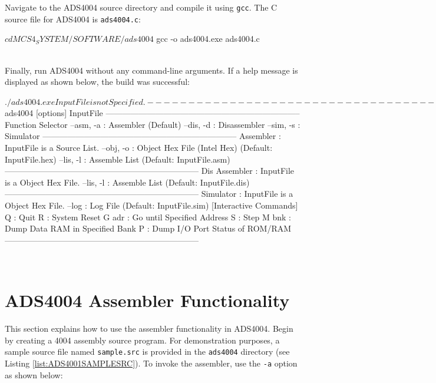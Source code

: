 Navigate to the ADS4004 source directory and compile it using \texttt{gcc}.  
The C source file for ADS4004 is \texttt{ads4004.c}:\\

\begin{scriptsize}
\begin{boxedverbatim}
$ cd MCS4_SYSTEM/SOFTWARE/ads4004
$ gcc -o ads4004.exe ads4004.c
\end{boxedverbatim}
\end{scriptsize}
\\

Finally, run ADS4004 without any command-line arguments.  
If a help message is displayed as shown below, the build was successful:\\

\begin{scriptsize}
\begin{boxedverbatim}
$ ./ads4004.exe
Input File is not Specified.
-----------------------------------------------------------------------
ADS4004 Command Usage
-----------------------------------------------------------------------
$ ads4004 [options] InputFile
-----------------------------------------------------------------------
Function Selector
    --asm, -a : Assembler (Default)
    --dis, -d : Disassembler
    --sim, -s : Simulator
-----------------------------------------------------------------------
Assembler : InputFile is a Source List.
    --obj, -o : Object Hex File (Intel Hex) (Default: InputFile.hex)
    --lis, -l : Assemble List (Default: InputFile.asm)
-----------------------------------------------------------------------
Dis Assembler : InputFile is a Object Hex File.
    --lis, -l : Assemble List (Default: InputFile.dis)
-----------------------------------------------------------------------
Simulator : InputFile is a Object Hex File.
    --log     : Log File (Default: InputFile.sim)
    [Interactive Commands]
        Q     : Quit
        R     : System Reset
        G adr : Go until Specified Address
        S     : Step
        M bnk : Dump Data RAM in Specified Bank
        P     : Dump I/O Port Status of ROM/RAM
-----------------------------------------------------------------------
\end{boxedverbatim}
\end{scriptsize}
\\

\section{ADS4004 Assembler Functionality}
This section explains how to use the assembler functionality in ADS4004.  
Begin by creating a 4004 assembly source program. For demonstration purposes, a sample source file named \texttt{sample.src} is provided in the \texttt{ads4004} directory (see Listing \ref{list:ADS4001SAMPLESRC}).  
To invoke the assembler, use the \texttt{-a} option as shown below:\\

